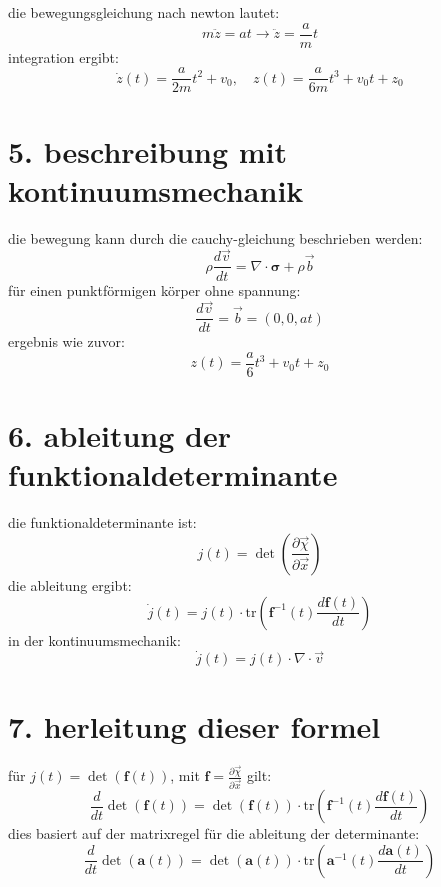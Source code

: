 \documentclass[a4paper,12pt]{article}
\begin{document}
die bewegungsgleichung nach newton lautet:
\[
m \ddot{z} = a t \rightarrow \ddot{z} = \frac{a}{m} t
\]
integration ergibt:
\[
\dot{z}(t) = \frac{a}{2m} t^2 + v_0, \quad z(t) = \frac{a}{6m} t^3 + v_0 t + z_0
\]

\section*{5. beschreibung mit kontinuumsmechanik}

die bewegung kann durch die cauchy-gleichung beschrieben werden:
\[
\rho \frac{d\vec{v}}{dt} = \nabla \cdot \boldsymbol{\sigma} + \rho \vec{b}
\]
für einen punktförmigen körper ohne spannung:
\[
\frac{d\vec{v}}{dt} = \vec{b} = (0, 0, a t)
\]
ergebnis wie zuvor:
\[
z(t) = \frac{a}{6} t^3 + v_0 t + z_0
\]

\section*{6. ableitung der funktionaldeterminante}

die funktionaldeterminante ist:
\[
j(t) = \det\left( \frac{\partial \vec{\chi}}{\partial \vec{x}} \right)
\]
die ableitung ergibt:
\[
\dot{j}(t) = j(t) \cdot \text{tr}\left( \mathbf{f}^{-1}(t) \frac{d \mathbf{f}(t)}{dt} \right)
\]
in der kontinuumsmechanik:
\[
\dot{j}(t) = j(t) \cdot \nabla \cdot \vec{v}
\]

\section*{7. herleitung dieser formel}

für $j(t) = \det(\mathbf{f}(t))$, mit $\mathbf{f} = \frac{\partial \vec{\chi}}{\partial \vec{x}}$ gilt:
\[
\frac{d}{dt} \det(\mathbf{f}(t)) = \det(\mathbf{f}(t)) \cdot \text{tr}\left( \mathbf{f}^{-1}(t) \frac{d\mathbf{f}(t)}{dt} \right)
\]
dies basiert auf der matrixregel für die ableitung der determinante:
\[
\frac{d}{dt} \det(\mathbf{a}(t)) = \det(\mathbf{a}(t)) \cdot \text{tr}\left( \mathbf{a}^{-1}(t) \frac{d\mathbf{a}(t)}{dt} \right)
\]
\end{document}
